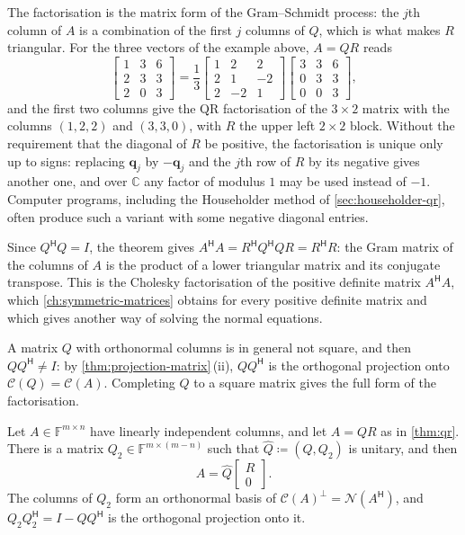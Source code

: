 The factorisation is the matrix form of the Gram--Schmidt process: the $j$th column of $A$ is a combination of the first $j$ columns of $Q$, which is what makes $R$ triangular. For the three vectors of the example above, $A=QR$ reads
\begin{equation}
\begin{bmatrix}1&3&6\\2&3&3\\2&0&3\end{bmatrix}=\frac13\begin{bmatrix}1&2&2\\2&1&-2\\2&-2&1\end{bmatrix}\begin{bmatrix}3&3&6\\0&3&3\\0&0&3\end{bmatrix},
\label{eq:qr-example}
\end{equation}
and the first two columns give the QR factorisation of the $3\times2$ matrix with the columns $(1,2,2)$ and $(3,3,0)$, with $R$ the upper left $2\times2$ block. Without the requirement that the diagonal of $R$ be positive, the factorisation is unique only up to signs: replacing $\mathbf q_j$ by $-\mathbf q_j$ and the $j$th row of $R$ by its negative gives another one, and over $\mathbb C$ any factor of modulus $1$ may be used instead of $-1$. Computer programs, including the Householder method of \cref{sec:householder-qr}, often produce such a variant with some negative diagonal entries.

Since $Q^{\mathsf H}Q=I$, the theorem gives $A^{\mathsf H}A=R^{\mathsf H}Q^{\mathsf H}QR=R^{\mathsf H}R$: the Gram matrix of the columns of $A$ is the product of a lower triangular matrix and its conjugate transpose. This is the Cholesky factorisation of the positive definite matrix $A^{\mathsf H}A$, which \cref{ch:symmetric-matrices} obtains for every positive definite matrix and which gives another way of solving the normal equations.

A matrix $Q$ with orthonormal columns is in general not square, and then $QQ^{\mathsf H}\ne I$: by \cref{thm:projection-matrix}\,(ii), $QQ^{\mathsf H}$ is the orthogonal projection onto $\mathcal C(Q)=\mathcal C(A)$. Completing $Q$ to a square matrix gives the full form of the factorisation.

\begin{corollary}
\label{cor:full-qr}
Let $A\in\mathbb F^{m\times n}$ have linearly independent columns, and let $A=QR$ as in \cref{thm:qr}. There is a matrix $Q_2\in\mathbb F^{m\times(m-n)}$ such that $\hat Q\coloneqq(Q,Q_2)$ is unitary, and then
\[
A=\hat Q\begin{bmatrix}R\\0\end{bmatrix} .
\]
The columns of $Q_2$ form an orthonormal basis of $\mathcal C(A)^\perp=\mathcal N(A^{\mathsf H})$, and $Q_2Q_2^{\mathsf H}=I-QQ^{\mathsf H}$ is the orthogonal projection onto it.
\end{corollary}

